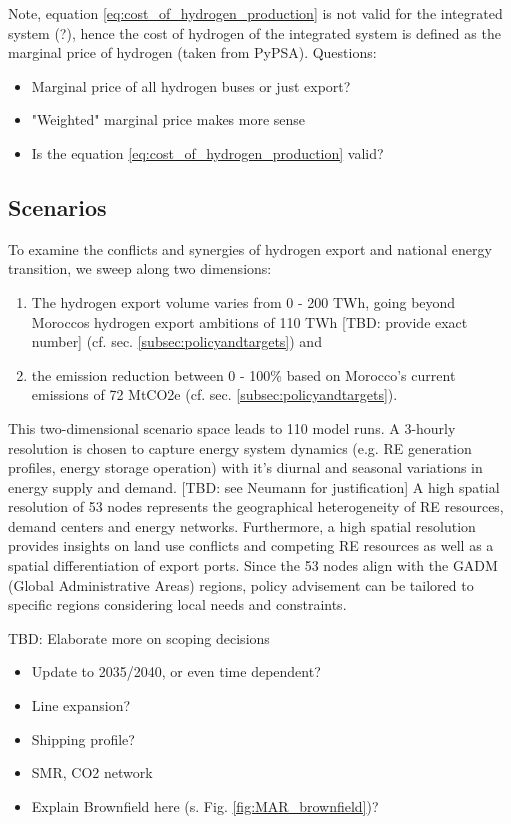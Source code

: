 Note, equation \ref{eq:cost_of_hydrogen_production} is not valid for the integrated system (?),
hence the cost of hydrogen of the integrated system is defined as the marginal price of hydrogen (taken from PyPSA).
Questions:
\begin{itemize}
    \item Marginal price of all hydrogen buses or just export?
    \item "Weighted" marginal price makes more sense
    \item Is the equation \ref{eq:cost_of_hydrogen_production} valid?
\end{itemize}


\subsection{Scenarios}
\label{subsec:scenarios}
To examine the conflicts and synergies of hydrogen export and national energy transition, we sweep along two dimensions:
\begin{enumerate}
    \item The hydrogen export volume varies from 0 - 200 TWh, going beyond Moroccos hydrogen export ambitions of 110 TWh [TBD: provide exact number] (cf. sec. \ref{subsec:policyandtargets}) and
    \item the emission reduction between 0 - 100\% based on Morocco's current emissions of 72 MtCO2e (cf. sec. \ref{subsec:policyandtargets}).
\end{enumerate}
This two-dimensional scenario space leads to 110 model runs. 
A 3-hourly resolution is chosen to capture energy system dynamics (e.g. RE generation profiles, energy storage operation) with it's diurnal and seasonal variations in energy supply and demand. [TBD: see Neumann for justification]
A high spatial resolution of 53 nodes represents the geographical heterogeneity of RE resources, demand centers and energy networks. Furthermore, a high spatial resolution provides insights on land use conflicts and competing RE resources as well as a spatial differentiation of export ports. Since the 53 nodes align with the GADM (Global Administrative Areas) regions, policy advisement can be tailored to specific regions considering local needs and constraints.

TBD: Elaborate more on scoping decisions
\begin{itemize}
    \item Update to 2035/2040, or even time dependent?
    \item Line expansion?
    \item Shipping profile?
    \item SMR, CO2 network
    \item Explain Brownfield here (s. Fig. \ref{fig:MAR_brownfield})?
\end{itemize}




